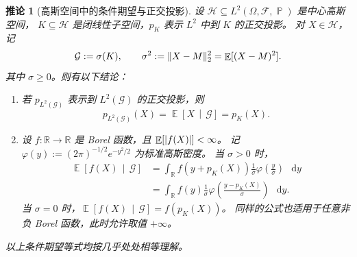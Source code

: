 \documentclass[UTF8,11pt,a4paper,oneside,fontset=fandol]{ctexrep}
\numberwithin{equation}{section}
\theoremstyle{plain}
\newtheorem{corollary}[theorem]{推论}
\theoremstyle{definition}
\theoremstyle{remark}
\newcommand{\R}{\mathbb{R}}
\newcommand{\F}{\mathcal{F}}
\newcommand{\Hcal}{\mathcal{H}}
\DeclareMathOperator{\Prob}{\mathbb{P}}
\DeclareMathOperator{\E}{\mathbb{E}}
\newcommand{\dd}{\mathop{}\!\mathrm{d}}
\newcommand{\Econd}[2]{%
  \E\!\left[#1\,\middle|\,#2\right]}
\DeclarePairedDelimiter{\abs}{\lvert}{\rvert}
\DeclarePairedDelimiter{\norm}{\lVert}{\rVert}
\begin{document}
\begin{samepage}
\begin{corollary}[高斯空间中的条件期望与正交投影]
\label{cor:gaussian-conditional-projection}
设 $\Hcal\subseteq L^2(\Omega,\F,\Prob)$ 是中心高斯空间，
$K\subseteq\Hcal$ 是闭线性子空间，$p_K$ 表示 $L^2$ 中到 $K$ 的正交投影。
对 $X\in\Hcal$，记
\[
  \mathcal G:=\sigma(K),\qquad
  \sigma^2:=\norm{X-M}_2^2=\E[(X-M)^2].
\]
其中 $\sigma\ge0$。则有以下结论：
\begin{enumerate}[label=(\roman*)]
  \item 若 $p_{L^2(\mathcal G)}$ 表示到 $L^2(\mathcal G)$ 的正交投影，则
    \begin{equation}
      \label{eq:gaussian-conditional-projection}
      p_{L^2(\mathcal G)}(X)=\Econd{X}{\mathcal G}=p_K(X).
    \end{equation}
  \item 设 $f:\R\to\R$ 是 Borel 函数，且 $\E[\abs{f(X)}]<\infty$。
    记 $\varphi(y):=(2\pi)^{-1/2}e^{-y^2/2}$ 为标准高斯密度。
    当 $\sigma>0$ 时，
    \begin{equation}
      \label{eq:gaussian-conditional-integral}
      \begin{aligned}
        \Econd{f(X)}{\mathcal G}
        &=\int_{\R}f(y+p_K(X))\frac1\sigma
            \varphi\!\left(\frac y\sigma\right)\,\dd y\\
        &=\int_{\R}f(y)\frac1\sigma
            \varphi\!\left(\frac{y-p_K(X)}{\sigma}\right)\,\dd y.
      \end{aligned}
    \end{equation}
    当 $\sigma=0$ 时，$\Econd{f(X)}{\mathcal G}=f(p_K(X))$。
    同样的公式也适用于任意非负 Borel 函数，此时允许取值 $+\infty$。
\end{enumerate}
以上条件期望等式均按几乎处处相等理解。
\end{corollary}
\end{samepage}
\end{document}
